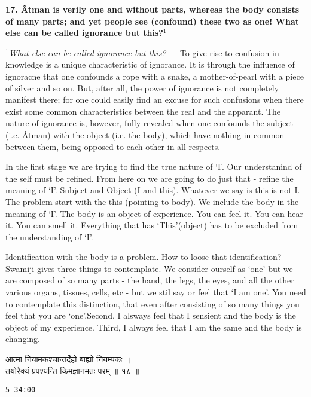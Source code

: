 \documentclass{article}
\begin{document}
\bigskip

\textbf{ 17. Âtman is verily one and without parts, whereas the body consists
of many parts; and yet people see (confound) these two as one! What else can be
called ignorance but this?$^1$ }

{\small \textit{$^1$What else can be called
ignorance but this?} --- To give rise to confusion in knowledge is a unique
characteristic of ignorance. It is through the influence of ignoracne that one
confounds a rope with a snake, a mother-of-pearl with a piece of silver and so
on. But, after all, the power of ignorance is not completely manifest there;
for one could easily find an excuse for such confusions when there exist some
common characteristics between the real and the apparant. The nature of
ignorance is, however, fully revealed when one confounds the subject (i.e.
Âtman) with the object (i.e. the body), which have nothing in common between
them, being opposed to each other in all respects.  }


\begin{oframed}

In the first stage we are trying to find the true nature of `I'. Our
    understanind of the self must be refined. From here on we are going to do
    just that - refine the meaning of `I'. Subject and Object (I and this).
    Whatever we say is this is not I. The problem start with the this (pointing
    to body). We include the body in the meaning of `I'. The body is an object
    of experience. You can feel it. You can hear it. You can smell it.
    Everything that has `This'(object) has to be excluded from the
    understanding of `I'.

    Identification with the body is a problem. How to loose that
    identification? Swamiji gives three things to contemplate. We consider
    ourself as `one' but we are composed of so many parts - the hand, the legs,
    the eyes, and all the other various organs, tissues, cells, etc - but we
    stil say or feel that `I am one'. You need to contemplate this distinction,
    that even after consisting of so many things you feel that you are
    `one'.Second, I alsways feel that I sensient and the body is the object of
    my experience. Third, I always feel that I am the same and the body is
    changing.

\end{oframed}


\begin{large}
\begin{center}
    \begin{hindi}
    आत्मा नियामकश्चान्तर्देहो बाह्यो नियम्यकः ।\\
    तयोरैक्यं प्रपश्यन्ति किमज्ञानमतः परम् ॥ १८ ॥
    \end{hindi}
\end{center}
\end{large}
\texttt{5-34:00}
\end{document}
